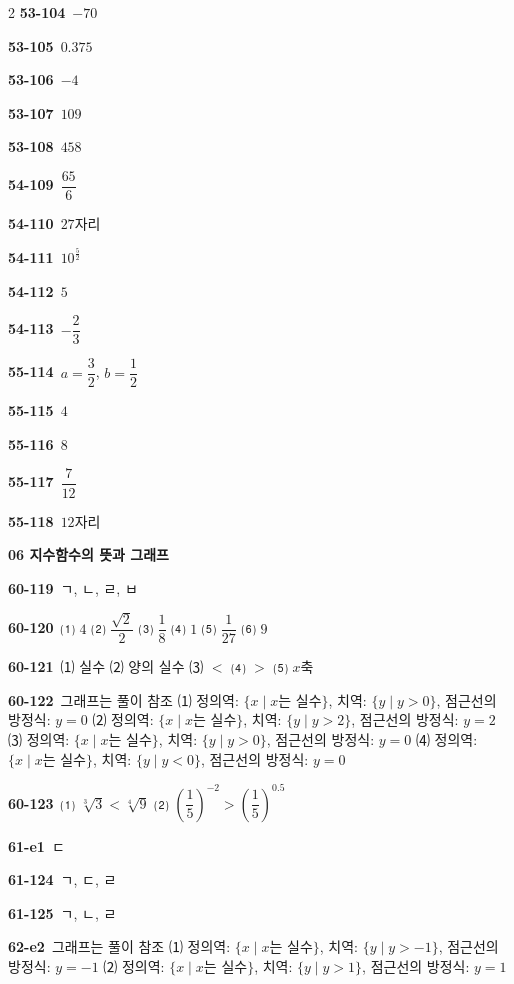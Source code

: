 \documentclass[10pt,a4paper]{article}
\begin{document}
\begin{multicols}{2}
\noindent\textbf{53-104}\ $-70$\par
\noindent\textbf{53-105}\ $0.375$\par
\noindent\textbf{53-106}\ $-4$\par
\noindent\textbf{53-107}\ $109$\par
\noindent\textbf{53-108}\ $458$\par
\noindent\textbf{54-109}\ $\dfrac{65}{6}$\par
\noindent\textbf{54-110}\ $27$자리\par
\noindent\textbf{54-111}\ $10^{\frac{5}{2}}$\par
\noindent\textbf{54-112}\ $5$\par
\noindent\textbf{54-113}\ $-\dfrac{2}{3}$\par
\noindent\textbf{55-114}\ $a=\dfrac{3}{2}$, $b=\dfrac{1}{2}$\par
\noindent\textbf{55-115}\ $4$\par
\noindent\textbf{55-116}\ $8$\par
\noindent\textbf{55-117}\ $\dfrac{7}{12}$\par
\noindent\textbf{55-118}\ $12$자리\par
\noindent\textbf{06 지수함수의 뜻과 그래프}\par\smallskip
\noindent\textbf{60-119}\ ㄱ, ㄴ, ㄹ, ㅂ\par
\noindent\textbf{60-120}\ ⑴ $4$ \quad ⑵ $\dfrac{\sqrt{2}}{2}$ \quad ⑶ $\dfrac{1}{8}$ \quad ⑷ $1$ \quad ⑸ $\dfrac{1}{27}$ \quad ⑹ $9$\par
\noindent\textbf{60-121}\ ⑴ 실수 \quad ⑵ 양의 실수 \quad ⑶ $<$ \quad ⑷ $>$ \quad ⑸ $x$축\par
\noindent\textbf{60-122}\ 그래프는 풀이 참조 \quad ⑴ 정의역: $\{x \mid x$는 실수$\}$, 치역: $\{y \mid y>0\}$, 점근선의 방정식: $y=0$ \quad ⑵ 정의역: $\{x \mid x$는 실수$\}$, 치역: $\{y \mid y>2\}$, 점근선의 방정식: $y=2$ \quad ⑶ 정의역: $\{x \mid x$는 실수$\}$, 치역: $\{y \mid y>0\}$, 점근선의 방정식: $y=0$ \quad ⑷ 정의역: $\{x \mid x$는 실수$\}$, 치역: $\{y \mid y<0\}$, 점근선의 방정식: $y=0$\par
\noindent\textbf{60-123}\ ⑴ $\sqrt[3]{3}<\sqrt[4]{9}$ \quad ⑵ $\left(\dfrac{1}{5}\right)^{-2}>\left(\dfrac{1}{5}\right)^{0.5}$\par
\noindent\textbf{61-e1}\ ㄷ\par
\noindent\textbf{61-124}\ ㄱ, ㄷ, ㄹ\par
\noindent\textbf{61-125}\ ㄱ, ㄴ, ㄹ\par
\noindent\textbf{62-e2}\ 그래프는 풀이 참조 \quad ⑴ 정의역: $\{x \mid x$는 실수$\}$, 치역: $\{y \mid y>-1\}$, 점근선의 방정식: $y=-1$ \quad ⑵ 정의역: $\{x \mid x$는 실수$\}$, 치역: $\{y \mid y>1\}$, 점근선의 방정식: $y=1$\par

\end{multicols}
\end{document}
